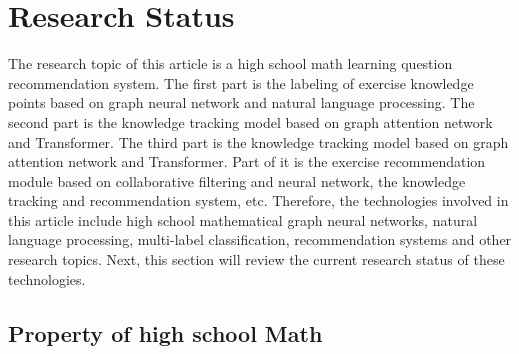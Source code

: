 \section{Research Status}

The research topic of this article is a high school math learning question recommendation system. The first part is the labeling of exercise knowledge points based on graph neural network and natural language processing. The second part is the knowledge tracking model based on graph attention network and Transformer. The third part is the knowledge tracking model based on graph attention network and Transformer. Part of it is the exercise recommendation module based on collaborative filtering and neural network, the knowledge tracking and recommendation system, etc. Therefore, the technologies involved in this article include high school mathematical graph neural networks, natural language processing, multi-label classification, recommendation systems and other research topics. Next, this section will review the current research status of these technologies.

\subsection{Property of high school Math}




